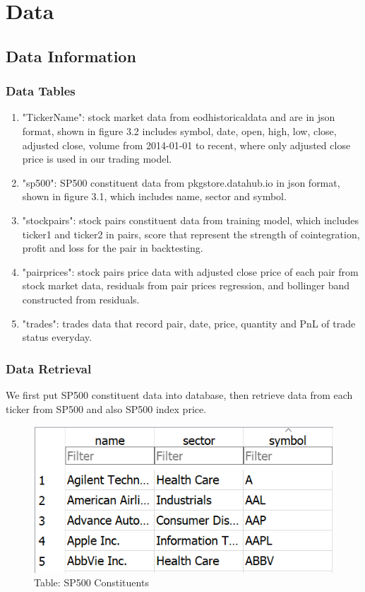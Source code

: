 \chapter{Data}
\label{chap:data}


\section{Data Information}

\subsection{Data Tables}
\begin{enumerate}
    \item "TickerName": stock market data from eodhistoricaldata and are in json format, shown in figure 3.2 includes symbol, date, open, high, low, close, adjusted close, volume from 2014-01-01 to recent, where only adjusted close price is used in our trading model.
    \item "sp500": SP500 constituent data from pkgstore.datahub.io in json format, shown in figure 3.1, which includes name, sector and symbol.
    \item "stockpairs": stock pairs constituent data from training model, which includes ticker1 and ticker2 in pairs, score that represent the strength of cointegration, profit and loss for the pair in backtesting.
    \item "pairprices": stock pairs price data with adjusted close price of each pair from stock market data, residuals from pair prices regression, and bollinger band constructed from residuals.
    \item "trades": trades data that record pair, date, price, quantity and PnL of trade status everyday.
\end{enumerate}

\subsection{Data Retrieval}
We first put SP500 constituent data into database, then retrieve data from each ticker from SP500 and also SP500 index price.

\begin{figure}
\centering
\includegraphics[scale=0.6]{data/images/sp500table.png}
\caption{Table: SP500 Constituents}
\label{fig:sp500}
\end{figure}

